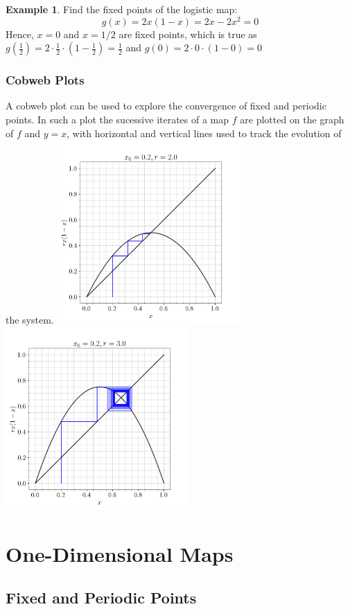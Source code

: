 \documentclass[11pt]{article}
\theoremstyle{definition}
\newtheorem{exmp}{Example}[section]
\begin{document}
\begin{exmp}
Find the fixed points of the logistic map: \[g(x) = 2x(1-x) = 2x - 2x^2 = 0\] Hence, $x = 0$ and $x = 1/2$ are fixed points, which is true as $g(\frac{1}{2}) = 2 \cdot \frac{1}{2} \cdot (1 - \frac{1}{2}) = \frac{1}{2}$ and $g(0) = 2 \cdot 0 \cdot (1 - 0) = 0$
\end{exmp}

\subsubsection{Cobweb Plots}
A cobweb plot can be used to explore the convergence of fixed and periodic points. In such a plot the sucessive iterates of a map $f$ are plotted on the graph of $f$ and $y = x$, with horizontal and vertical lines used to track the evolution of the system.
\includegraphics[width=7cm]{cobweb_0.2_2.0}
\includegraphics[width=7cm]{cobweb_0.2_3.0}

\section{One-Dimensional Maps}
\subsection{Fixed and Periodic Points}
\end{document}
